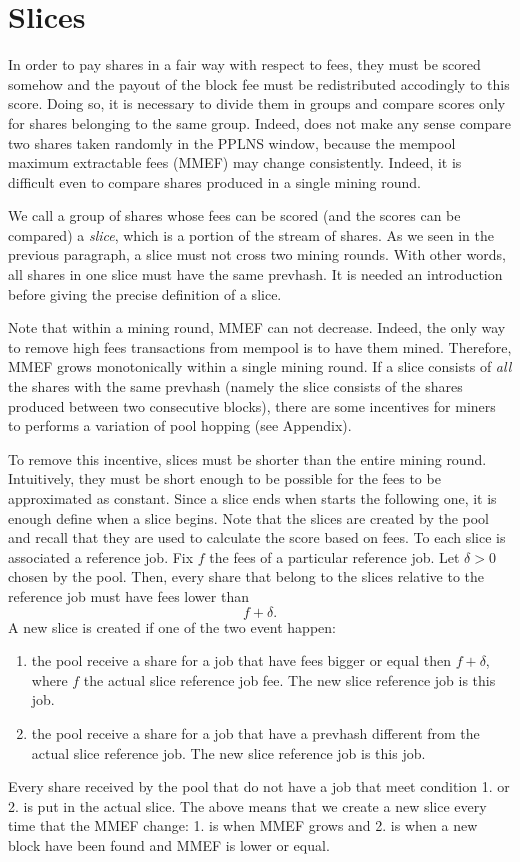 \documentclass[11pt]{article}
\begin{document}
\section{Slices}
In order to pay shares in a fair way with respect to fees, they must be scored somehow and the payout of the block fee must be redistributed accodingly to this score. Doing so, it is necessary to divide them in groups and compare scores only for shares belonging to the same group. Indeed, does not make any sense compare two shares taken randomly in the PPLNS window, because the mempool maximum extractable fees (MMEF) may change consistently. Indeed, it is difficult even to compare shares produced in a single mining round.

We call a group of shares whose fees can be scored (and the scores can be compared) a \emph{slice}, which is a portion of the stream of shares. As we seen in the previous paragraph, a slice must not cross two mining rounds. With other words, all shares in one slice must have the same prevhash. It is needed an introduction before giving the precise definition of a slice.

Note that within a mining round, MMEF can not decrease. Indeed,  the only way to remove high fees transactions from mempool is to have them mined. Therefore, MMEF grows monotonically within a single mining round. If a slice consists of \emph{all} the shares with the same prevhash (namely the slice consists of the shares produced between two consecutive blocks), there are some incentives for miners to performs a variation of pool hopping (see Appendix).

To remove this incentive, slices must be shorter than the entire mining round. Intuitively, they must be short enough to be possible for the fees to be approximated as constant. Since a slice ends when starts the following one, it is enough define when a slice begins. Note that the slices are created by the pool and recall that they are used to calculate the score based on fees. To each slice is associated a reference job. Fix $f$ the fees of a particular reference job. Let $\delta>0$ chosen by the pool. Then, every share that belong to the slices relative to the reference job must have fees lower than
\[ f+\delta.\]
A new slice is created if one of the two event happen:
\begin{enumerate}
	\item the pool receive a share for a job that have fees bigger or equal then $f+\delta$, where $f$ the actual slice reference job fee. The new slice reference job is this job.
	\item the pool receive a share for a job that have a prevhash different from the actual slice reference job. The new slice reference job is this job.
\end{enumerate}
Every share received by the pool that do not have a job that meet condition 1. or 2. is put in the actual slice. The above means that we create a new slice every time that the MMEF change: 1. is when MMEF grows and 2. is when a new block have been found and MMEF is lower or equal.
\end{document}

